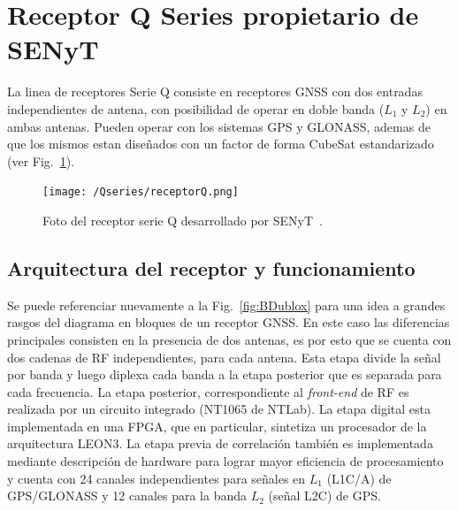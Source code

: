 \documentclass[a4paper,12pt,oneside,onecolumn,final,openright]{book}%
\begin{document}
\section{Receptor Q Series propietario de SENyT}
	La linea de receptores Serie Q consiste en receptores GNSS con dos entradas independientes de antena, con posibilidad de operar en doble banda ($L_1$ y $L_2$) en ambas antenas. Pueden operar con los sistemas GPS y GLONASS, ademas de que los mismos estan diseñados con un factor de forma CubeSat estandarizado~\cite{Qseries_1}~\cite{Qseries_2} (ver Fig.~\ref{fig:Q}).
\begin{figure}
    \centering
    \texttt{[image: /Qseries/receptorQ.png]}
    \caption{Foto del receptor serie Q desarrollado por SENyT~\cite{Qseries_2}.}
    \label{fig:Q}
\end{figure}
\subsection{Arquitectura del receptor y funcionamiento}\label{sec:Qarq}
	Se puede referenciar nuevamente a la Fig.~\ref{fig:BDublox} para una idea a grandes rasgos del diagrama en bloques de un receptor GNSS. En este caso las diferencias principales consisten en la presencia de dos antenas, es por esto que se cuenta con dos cadenas de RF independientes, para cada antena. Esta etapa divide la señal por banda y luego diplexa cada banda a la etapa posterior que es separada para cada frecuencia. La etapa posterior, correspondiente al \textit{front-end} de RF es realizada por un circuito integrado (NT1065 de NTLab). La etapa digital esta implementada en una FPGA, que en particular, sintetiza un procesador de la arquitectura LEON3. La etapa previa de correlación también es implementada mediante descripción de hardware para lograr mayor eficiencia de procesamiento y cuenta con 24 canales independientes para señales en $L_1$ (L1C/A) de GPS/GLONASS y 12 canales para la banda $L_2$ (señal L2C) de GPS.
\end{document}
